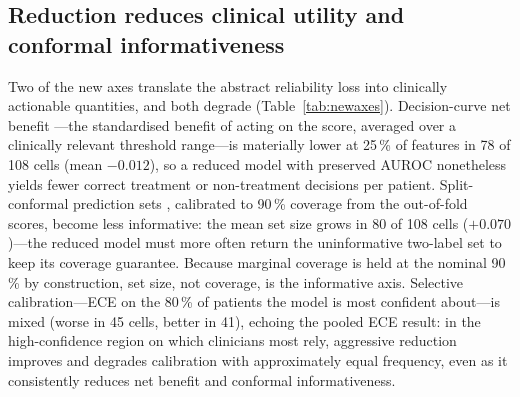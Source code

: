 \documentclass[fleqn,10pt]{wlscirep}
\newcommand{\result}[1]{#1}
\begin{document}
\subsection{Reduction reduces clinical utility and conformal informativeness}
Two of the new axes translate the abstract reliability loss into clinically actionable quantities, and
both degrade (Table~\ref{tab:newaxes}). Decision-curve net benefit \cite{vickers2006decision}---the
standardised benefit of acting on the score, averaged over a clinically relevant threshold range---is
materially lower at 25\,\% of features in \result{78} of \result{108} cells (mean \result{$-0.012$}),
so a reduced model with preserved AUROC nonetheless yields fewer correct
treatment or non-treatment decisions per patient. Split-conformal prediction sets
\cite{romano2020classification,angelopoulos2023conformal}, calibrated to 90\,\% coverage from the
out-of-fold scores, become less informative: the mean set size grows in \result{80} of \result{108}
cells (\result{$+0.070$})---the reduced model must more often return the uninformative two-label set to
keep its coverage guarantee. Because marginal coverage is held at the nominal 90\,\% by construction,
set size, not coverage, is the informative axis. Selective calibration---ECE on the 80\,\% of patients
the model is most confident about---is mixed (worse in \result{45} cells, better in \result{41}),
echoing the pooled ECE result: in the high-confidence region on which clinicians most rely, aggressive
reduction improves and degrades calibration with approximately equal frequency, even as it consistently
reduces net benefit and conformal informativeness.

\begin{table}[t]
\centering
\caption{The four new reliability axes at 25\,\% of features versus the full-feature model (mean over
twelve datasets, three rankers, three learners; the gaps are over the nine group-bearing datasets---the
ECE, AUROC, and net-benefit gaps over the eight with a valid two-class subgroup, 72 cells, and the
conformal-coverage gap over all nine, 81 cells). Net benefit is a clinical-utility gain ($\uparrow$
better); the others are costs ($\downarrow$ better). Computed from the released per-configuration result summary.}
\label{tab:newaxes}

\end{table}
\end{document}
